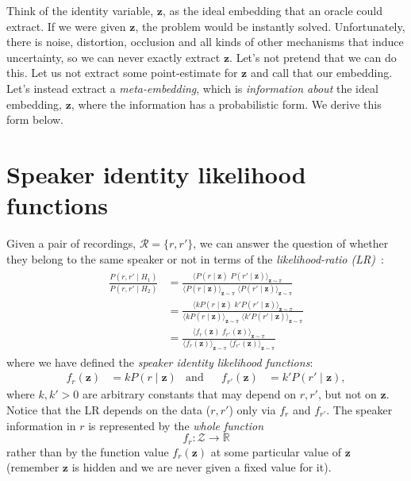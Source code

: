 \documentclass[a4paper,oneside,12pt,english]{report}
\def\zvec{\mathbf{z}}
\def\expv#1#2{\bigl\langle#1\bigr\rangle_{#2}}
\def\R{\mathbb{R}}
\def\Zset{\mathcal{Z}}
\def\Rset{\mathcal{R}}
\def\Zset{\mathcal{Z}}
\begin{document}
Think of the identity variable, $\zvec$, as the ideal embedding that an oracle could extract. If we were given $\zvec$, the problem would be instantly solved. Unfortunately, there is noise, distortion, occlusion and all kinds of other mechanisms that induce uncertainty, so we can never exactly extract $\zvec$. Let's not pretend that we can do this. Let us not extract some point-estimate for $\zvec$ and call that our embedding. Let's instead extract a \emph{meta-embedding}, which is \emph{information about} the ideal embedding, $\zvec$, where the information has a probabilistic form. We derive this form below.


\section{Speaker identity likelihood functions}
\label{sec:silf}
Given a pair of recordings, $\Rset=\{r,r'\}$, we can answer the question of whether they belong to the same speaker or not in terms of the \emph{likelihood-ratio (LR)}~\cite{NikoCSL}:
\begin{align}
\label{eq:SLR}
\begin{split}
\frac{P(r,r'\mid H_1)}{P(r,r'\mid H_2)} &= \frac{\expv{P(r\mid\zvec)\;P(r'\mid\zvec)}{\zvec\sim\pi}}
{\expv{P(r\mid\zvec)}{\zvec\sim\pi}\;\expv{P(r'\mid\zvec)}{\zvec\sim\pi}} \\
&= \frac{\expv{kP(r\mid\zvec)\;k'P(r'\mid\zvec)}{\zvec\sim\pi}}
{\expv{kP(r\mid\zvec)}{\zvec\sim\pi}\;\expv{k'P(r'\mid\zvec)}{\zvec\sim\pi}} \\
&= \frac{\expv{f_r(\zvec)\;f_{r'}(\zvec)}{\zvec\sim\pi}}
{\expv{f_r(\zvec)}{\zvec\sim\pi}\;\expv{f_{r'}(\zvec)}{\zvec\sim\pi}}
\end{split}
\end{align}
where we have defined the \emph{speaker identity likelihood functions}: 
\begin{align}
f_r(\zvec)&=kP(r\mid\zvec)& \text{and} && f_{r'}(\zvec)&=k'P(r'\mid\zvec),
\end{align}
where $k,k'>0$ are arbitrary constants that may depend on $r,r'$, but not on $\zvec$. Notice that the LR depends on the data ($r,r'$) only via $f_r$ and $f_{r'}$. The speaker information in $r$ is represented by the \emph{whole function} 
$$f_r:\Zset\to\R$$ 
rather than by the function value $f_r(\zvec)$ at some particular value of $\zvec$ (remember $\zvec$ is hidden and we are never given a fixed value for it).
\end{document}
